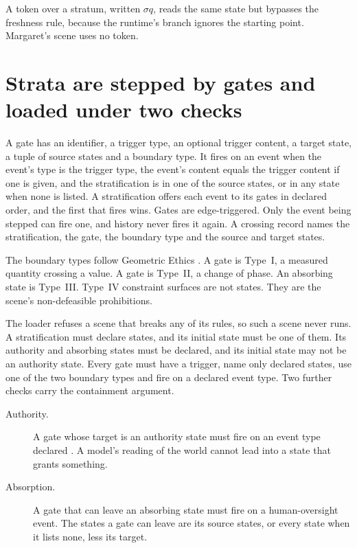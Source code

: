 A  token over a stratum, written $\sigma$\code{=}$q$, reads the
same state but bypasses the freshness rule, because the runtime's  branch ignores the
starting point. Margaret's scene uses no  token.

\section{Strata are stepped by gates and loaded under two checks}\label{sec:runtime-strata}

A gate has an identifier, a trigger type, an optional trigger content, a target state, a tuple of
source states and a boundary type. It fires on an event when the event's type is the trigger type,
the event's content equals the trigger content if one is given, and the stratification is in one of
the source states, or in any state when none is listed. A stratification offers each event to its
gates in declared order, and the first that fires wins. Gates are edge-triggered. Only the event
being stepped can fire one, and history never fires it again. A crossing record names the
stratification, the gate, the boundary type and the source and target states.

The boundary types follow Geometric Ethics \cite{bond2026geometricethics}. A  gate is
Type~I, a measured quantity crossing a value. A  gate is Type~II, a change of phase. An
absorbing state is Type~III. Type~IV constraint surfaces are not states. They are the scene's non-defeasible
prohibitions.

The loader refuses a scene that breaks any of its rules, so such a scene never runs. A stratification
must declare states, and its initial state must be one of them. Its authority and absorbing states
must be declared, and its initial state may not be an authority state. Every gate must have a
trigger, name only declared states, use one of the two boundary types and fire on a declared event
type. Two further checks carry the containment argument.
\begin{description}
\item[Authority.] A gate whose target is an authority state must fire on an event type declared
. A model's reading of the world cannot lead into a state that grants
something.
\item[Absorption.] A gate that can leave an absorbing state must fire on a human-oversight event. The
states a gate can leave are its source states, or every state when it lists none, less its target.
\end{description}

